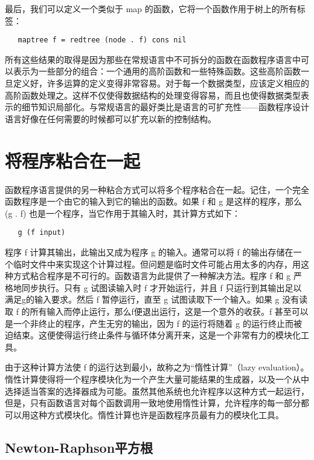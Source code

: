 \documentclass[12pt,a4paper]{article}
\begin{document}
最后，我们可以定义一个类似于 map 的函数，它将一个函数作用于树上的所有标签：

\begin{verbatim}
   maptree f = redtree (node . f) cons nil
\end{verbatim}

所有这些结果的取得是因为那些在常规语言中不可拆分的函数在函数程序语言中可以表示为一些部分的组合：一个通用的高阶函数和一些特殊函数。这些高阶函数一旦定义好，许多运算的定义变得非常容易。对于每一个数据类型，应该定义相应的高阶函数处理之。这样不仅使得数据结构的处理变得容易，而且也使得数据类型表示的细节知识局部化。与常规语言的最好类比是语言的可扩充性——函数程序设计语言好像在任何需要的时候都可以扩充以新的控制结构。

\section{将程序粘合在一起}

函数程序语言提供的另一种粘合方式可以将多个程序粘合在一起。记住，一个完全函数程序是一个由它的输入到它的输出的函数。如果 f 和 g 是这样的程序，那么 (g . f) 也是一个程序，当它作用于其输入时，其计算方式如下：

\begin{verbatim}
   g (f input)
\end{verbatim}

程序 f 计算其输出，此输出又成为程序 g 的输入。通常可以将 f 的输出存储在一个临时文件中来实现这个计算过程。但问题是临时文件可能占用太多的内存，用这种方式粘合程序是不可行的。函数语言为此提供了一种解决方法。程序 f 和 g 严格地同步执行。只有 g 试图读输入时 f 才开始运行，并且 f 只运行到其输出足以满足g的输入要求。然后 f 暂停运行，直至 g 试图读取下一个输入。如果 g 没有读取 f 的所有输入而停止运行，那么f便退出运行，这是一个意外的收获。f 甚至可以是一个非终止的程序，产生无穷的输出，因为 f 的运行将随着 g 的运行终止而被迫结束。这便使得运行终止条件与循环体分离开来，这是一个非常有力的模块化工具。

由于这种计算方法使 f 的运行达到最小，故称之为``惰性计算''（lazy evaluation）。惰性计算使得将一个程序模块化为一个产生大量可能结果的生成器，以及一个从中选择适当答案的选择器成为可能。虽然其他系统也允许程序以这种方式一起运行，但是，只有函数语言对每个函数调用一致地使用惰性计算，允许程序的每一部分都可以用这种方式模块化。惰性计算也许是函数程序员最有力的模块化工具。

\subsection{Newton-Raphson平方根}
\end{document}
